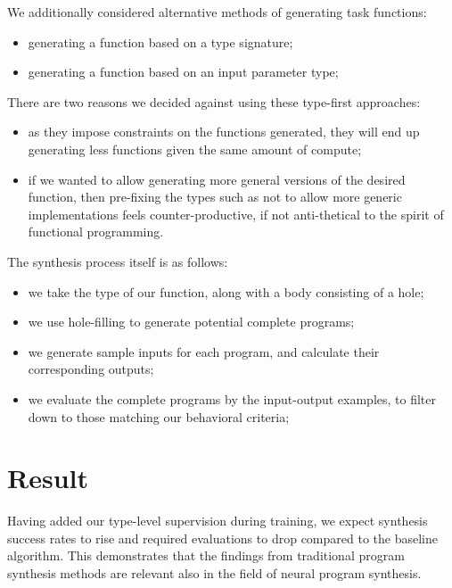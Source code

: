 \documentclass{article}
\begin{document}
We additionally considered alternative methods of generating task functions:
\begin{itemize}
    \item generating a function based on a type signature;
    \item generating a function based on an input parameter type; %
\end{itemize}
There are two reasons we decided against using these type-first approaches:
\begin{itemize}
    \item as they impose constraints on the functions generated, they will end up generating less functions given the same amount of compute;
    \item if we wanted to allow generating more general versions of the desired function, then pre-fixing the types such as not to allow more generic implementations feels counter-productive, if not anti-thetical to the spirit of functional programming.
\end{itemize}

The synthesis process itself is as follows:
\begin{itemize}
    \item we take the type of our function, along with a body consisting of a hole;
    \item we use hole-filling to generate potential complete programs;
    \item we generate sample inputs for each program, and calculate their corresponding outputs;
    \item we evaluate the complete programs by the input-output examples, to filter down to those matching our behavioral criteria;
\end{itemize}


\section{Result} %

Having added our type-level supervision during training, we expect synthesis success rates to rise and required evaluations to drop compared to the baseline algorithm.
This demonstrates that the findings from traditional program synthesis methods are relevant also in the field of neural program synthesis.
\end{document}
